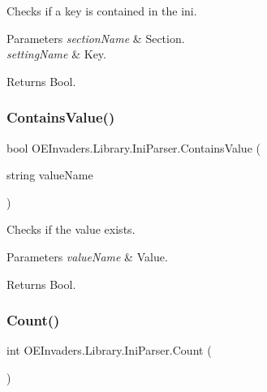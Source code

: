 Checks if a key is contained in the ini. 


\begin{DoxyParams}{Parameters}
{\em section\+Name} & Section.\\
\hline
{\em setting\+Name} & Key.\\
\hline
\end{DoxyParams}
\begin{DoxyReturn}{Returns}
Bool.
\end{DoxyReturn}
\mbox{\label{class_o_e_invaders_1_1_library_1_1_ini_parser_a996aa6c597d52a5e3cbd40cef1e7b381}} 
\subsubsection{\texorpdfstring{ContainsValue()}{ContainsValue()}}
{\footnotesize\ttfamily bool O\+E\+Invaders.\+Library.\+Ini\+Parser.\+Contains\+Value (\begin{DoxyParamCaption}\item[{string}]{value\+Name }\end{DoxyParamCaption})}



Checks if the value exists. 


\begin{DoxyParams}{Parameters}
{\em value\+Name} & Value.\\
\hline
\end{DoxyParams}
\begin{DoxyReturn}{Returns}
Bool.
\end{DoxyReturn}
\mbox{\label{class_o_e_invaders_1_1_library_1_1_ini_parser_a6249600db795ab959effc30ad7a05dc7}} 
\subsubsection{\texorpdfstring{Count()}{Count()}}
{\footnotesize\ttfamily int O\+E\+Invaders.\+Library.\+Ini\+Parser.\+Count (\begin{DoxyParamCaption}{ }\end{DoxyParamCaption})}




